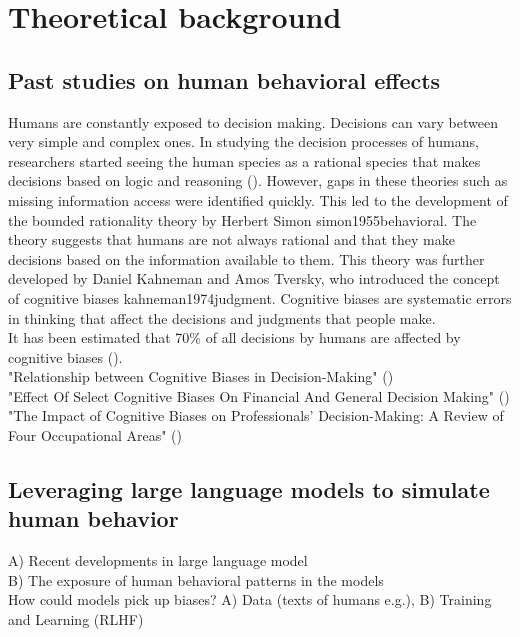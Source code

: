 \section{Theoretical background}

\subsection{Past studies on human behavioral effects}
Humans are constantly exposed to decision making. Decisions can vary between very simple and complex ones. In studying the decision processes of humans, researchers started seeing the human species as a rational species that makes decisions based on logic and reasoning (\cite{juarez2018analyzing}). However, gaps in these theories such as missing information access were identified quickly. This led to the development of the bounded rationality theory by Herbert Simon {simon1955behavioral}. The theory suggests that humans are not always rational and that they make decisions based on the information available to them. This theory was further developed by Daniel Kahneman and Amos Tversky, who introduced the concept of cognitive biases {kahneman1974judgment}. Cognitive biases are systematic errors in thinking that affect the decisions and judgments that people make. \\
It has been estimated that 70\% of all decisions by humans are affected by cognitive biases (\cite{juarez2018analyzing}). \\

"Relationship between Cognitive Biases in Decision-Making" (\cite{yeung2023relationship}) \\
"Effect Of Select Cognitive Biases On Financial And General Decision Making" (\cite{gupta2018effect}) \\
"The Impact of Cognitive Biases on Professionals’ Decision-Making: A Review of Four Occupational Areas" (\cite{berthet2022impact}) \\

\subsection{Leveraging large language models to simulate human behavior}
A) Recent developments in large language model\\
B) The exposure of human behavioral patterns in the models\\
How could models pick up biases? A) Data (texts of humans e.g.), B) Training and Learning (RLHF) \\

